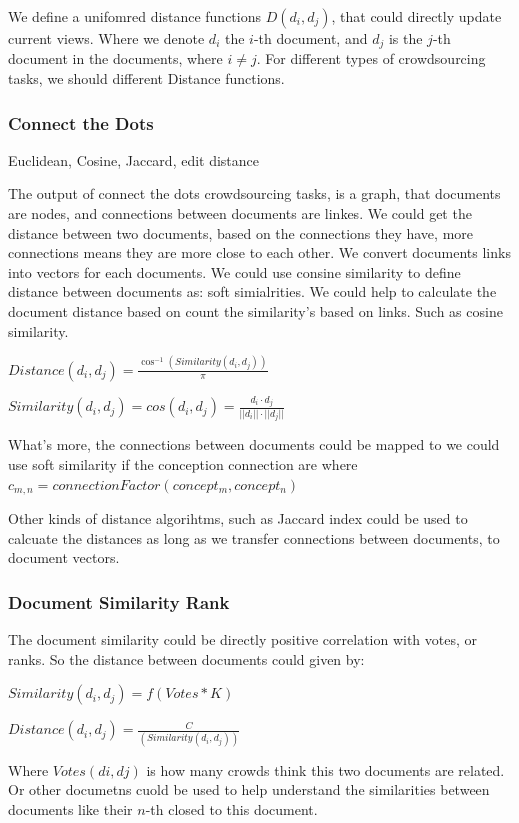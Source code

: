 \documentclass[journal]{vgtc}                %
\begin{document}
We define a unifomred distance functions $D(d_i, d_j)$, that could directly update current views. Where we denote $d_i$ the $i$-th document, and $d_j$ is the $j$-th document in the documents, where $i \neq j$.
For different types of crowdsourcing tasks, we should different Distance functions.
\subsubsection{Connect the Dots}

 Euclidean, Cosine, Jaccard, edit distance

The output of connect the dots crowdsourcing tasks, is a graph, that documents are nodes, and connections between documents are linkes. We could get the distance between two documents, based on the connections they have, more connections means they are more close to each other. We convert documents links into vectors for each documents. We could use consine similarity to define distance between documents as: soft simialrities. We could help to calculate the document distance based on count the similarity's based on links. Such as cosine similarity.

    $Distance(d_i, d_j) = \frac{\cos^{-1}(Similarity(d_i, d_j))}{\pi}$

    $Similarity(d_i, d_j) = cos(d_i, d_j) = \frac {d_i \cdot d_j}{||d_i|| \cdot ||d_j||} $

What's more, the connections between documents could be mapped to we could use soft similarity if the conception connection are where
 $c_{m,n} = connectionFactor(concept_m, concept_n)$

Other kinds of distance algorihtms, such as Jaccard index\cite{} could be used to calcuate the distances as long as we transfer connections between documents, to document vectors.

\subsubsection{Document Similarity Rank}
The document similarity could be directly positive correlation with votes, or ranks. So the distance between documents could given by: \newline

    $Similarity(d_i, d_j) = f(Votes * K )$

    $Distance(d_i, d_j) = \frac{C}{(Similarity(d_i, d_j))}$

Where $Votes(di, dj)$ is how many crowds think this two documents are related. Or other documetns cuold be used to help understand the similarities between documents like their $n$-th closed to this document.
\end{document}
